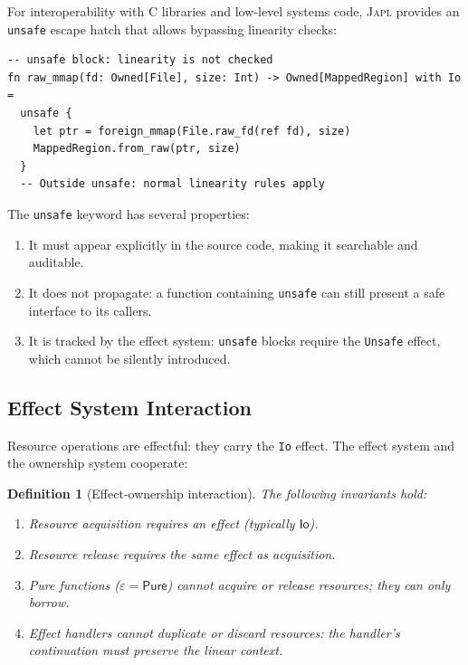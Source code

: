 \documentclass[11pt]{article}
\newtheorem{definition}[theorem]{Definition}
\newcommand{\JAPL}{\textsc{Japl}}
\newcommand{\Io}{\mathsf{Io}}
\newcommand{\Pure}{\mathsf{Pure}}
\begin{document}
For interoperability with C libraries and low-level systems code,
\JAPL{} provides an \texttt{unsafe} escape hatch that allows
bypassing linearity checks:

\begin{lstlisting}[caption={The unsafe escape hatch},label={lst:unsafe}]
-- unsafe block: linearity is not checked
fn raw_mmap(fd: Owned[File], size: Int) -> Owned[MappedRegion] with Io =
  unsafe {
    let ptr = foreign_mmap(File.raw_fd(ref fd), size)
    MappedRegion.from_raw(ptr, size)
  }
  -- Outside unsafe: normal linearity rules apply
\end{lstlisting}

The \texttt{unsafe} keyword has several properties:

\begin{enumerate}
  \item It must appear explicitly in the source code, making it
        searchable and auditable.
  \item It does not propagate: a function containing \texttt{unsafe}
        can still present a safe interface to its callers.
  \item It is tracked by the effect system: \texttt{unsafe} blocks
        require the \texttt{Unsafe} effect, which cannot be silently
        introduced.
\end{enumerate}

\subsection{Effect System Interaction}

Resource operations are effectful: they carry the \texttt{Io} effect.
The effect system and the ownership system cooperate:

\begin{definition}[Effect-ownership interaction]\label{def:effect-ownership}
The following invariants hold:
\begin{enumerate}[label=(\roman*)]
  \item Resource acquisition requires an effect (typically $\Io$).
  \item Resource release requires the same effect as acquisition.
  \item Pure functions ($\varepsilon = \Pure$) cannot acquire or
        release resources; they can only borrow.
  \item Effect handlers cannot duplicate or discard resources: the
        handler's continuation must preserve the linear context.
\end{enumerate}
\end{definition}
\end{document}
